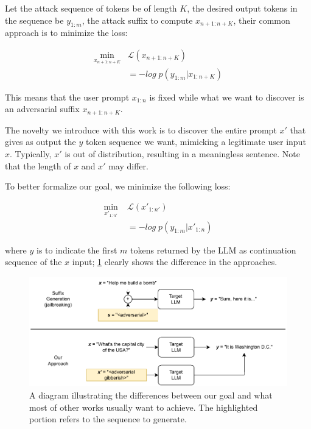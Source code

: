 \documentclass[../thesis]{subfiles}
\begin{document}
Let the attack sequence of tokens be of length $K$, 
the desired output tokens in the sequence be $y_{1:m}$,
the attack suffix to compute $x_{n+1:n+K}$,
their common approach is to minimize the loss:

\begin{equation}
\begin{split}
    \min_{x_{n+1:n+K}} & \mathcal{L}(x_{n+1:n+K}) \\
                       & = -log \; p(y_{1:m} | x_{1:n+K})
\end{split}
\label{eq:llm_loss_with_suffix}
\end{equation}

This means that the user prompt $x_{1:n}$ is fixed while what we want to discover is an adversarial suffix $x_{n+1:n+K}$.

The novelty we introduce with this work is to discover the entire prompt $x'$ that gives as output the $y$ token sequence we want, mimicking a legitimate user input $x$. Typically, $x'$ is out of distribution, resulting in a meaningless sentence. Note that the length of $x$ and $x'$ may differ.

To better formalize our goal, we minimize the following loss:

\begin{equation}
\begin{split}
    \min_{x'_{1:n'}} \; & \mathcal{L}(x'_{1:n'}) \\
                        & = -log \; p(y_{1:m} | x'_{1:n})
\end{split}
\label{eq:llm_loss_full_adv}
\end{equation}

where $y$ is to indicate the first $m$ tokens returned by the LLM as continuation sequence of the $x$ input; 
\cref{fig:llm_jailbraeak_suffix_vs_full_adversarial} clearly shows the difference in the approaches.

\begin{figure}
    \centering
    \includegraphics[width=\linewidth]{assets/Suffix_vs_full_adversarial.drawio.pdf}
    \caption{A diagram illustrating the differences between our goal and what most of other works usually want to achieve. The highlighted portion refers to the sequence to generate.}
    \label{fig:llm_jailbraeak_suffix_vs_full_adversarial}
\end{figure}
\end{document}
